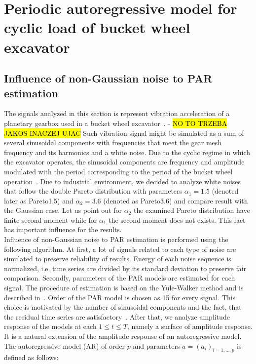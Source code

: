 \section{Periodic autoregressive model for cyclic load of bucket wheel excavator}\label{methodology_par}

\subsection{Influence of non-Gaussian noise to PAR estimation}

The signals analyzed in this section is represent vibration acceleration of a planetary gearbox used in a bucket wheel excavator~\cite{dybala2014empirical}. - \hl{NO TO TRZEBA JAKOS INACZEJ UJAC} Such vibration signal might be simulated as a sum of several sinusoidal components with frequencies that meet the gear mesh frequency and its harmonics and a white noise. Due to the cyclic regime in which the excavator operates, the sinusoidal components are frequency and amplitude  modulated with the period corresponding to the period of the bucket wheel operation~\cite{Chaari2012635}. Due to industrial environment, we decided to analyze white noises that follow the double Pareto distribution with parameters $\alpha_1=1.5$ (denoted later as Pareto1.5) and $\alpha_2=3.6$ (denoted as Pareto3.6) and compare result with the Gaussian case. Let us point out for $\alpha_2$ the examined Pareto distribution have finite second moment while for $\alpha_1$ the second moment does not exists. This fact has important influence for the results.\\
Influence of non-Gaussian noise to PAR estimation is performed using the following algorithm. At first, a lot of signals related to each type of noise are simulated to preserve reliability of results. Energy of each noise sequence is normalized, i.e. time series are divided by its standard deviation to preserve fair comparison. Secondly, parameters of the PAR models are estimated for each signal. The procedure of estimation is based on the Yule-Walker method and is described in~\cite{Wylomanska2014171}. Order of the PAR model is chosen as 15 for every signal. This choice is motivated by the number of sinusoidal components and the fact, that the residual time series are satisfactory~\cite{Wylomanska2014171}. After that, we analyze amplitude response of the models at each $1\leq t \leq T$, namely a surface of amplitude response. It is a natural extension of the amplitude response of an autoregressive model. The autoregressive model (AR) of order $p$ and parameters $a=(a_i)_{i=1,\ldots,p}$ is defined as follows:
